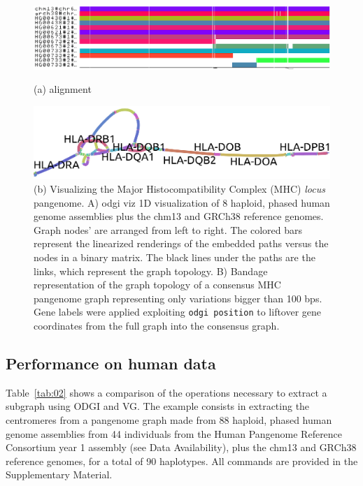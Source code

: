 \documentclass{bioinfo}
\begin{document}
    \begin{figure}
      \begin{minipage}[b]{0.48\textwidth}
        \includegraphics[width=\linewidth]{fig/mhc-align.eps}
        \caption{(a) alignment}
        \label{fig:1}
      \end{minipage}

      \begin{minipage}[b]{0.48\textwidth}
        \includegraphics[width=\linewidth]{fig/mhc-pangenome.eps}
        \caption{(b) Visualizing the Major Histocompatibility Complex
          (MHC) \textit{locus} pangenome. A) odgi viz 1D visualization
          of 8 haploid, phased human genome assemblies plus the chm13
          and GRCh38 reference genomes.  Graph nodes’ are arranged
          from left to right. The colored bars represent the
          linearized renderings of the embedded paths versus the nodes
          in a binary matrix. The black lines under the paths are the
          links, which represent the graph topology. B)
          Bandage~\citep{26099265} representation of the graph
          topology of a consensus MHC pangenome graph representing
          only variations bigger than 100 bps. Gene labels were
          applied exploiting \texttt{odgi position} to liftover gene
          coordinates from the full graph into the consensus graph.  }

        \label{fig:2}
      \end{minipage}
    \end{figure}

    \subsection{Performance on human data}

    Table~\ref{tab:02} shows a comparison of the operations necessary to extract a subgraph using ODGI and VG. The
    example consists in extracting the centromeres from a pangenome graph made from 88 haploid, phased human genome
    assemblies from 44 individuals from the Human Pangenome Reference Consortium year 1 assembly (see Data
    Availability), plus the chm13 and GRCh38 reference genomes, for a total of 90 haplotypes. All commands are provided
    in the Supplementary Material.
\end{document}
